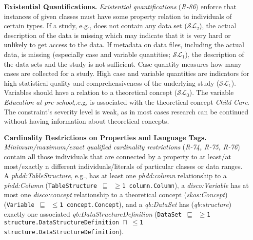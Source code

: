 \documentclass{llncs}
\newcommand{\ms}[1]{\texttt{#1}}
\begin{document}
\textbf{Existential Quantifications.}
\emph{Existential quantifications} (\emph{R-86}) enforce that instances of given classes must have some property relation to individuals of certain types.
If a study, e.g., does not contain any data set ($\mathcal{SL}_{2}$), the actual description of the data is missing which may indicate that it is very hard or unlikely to get access to the data.
If metadata on data files, including the actual data, is missing (especially case and variable quantities; $\mathcal{SL}_{1}$), the description of the data sets and the study is not sufficient.
Case quantity measures how many cases are collected for a study.
High case and variable quantities are indicators for high statistical quality and comprehensiveness of the underlying study ($\mathcal{SL}_{1}$).
Variables should have a relation to a theoretical concept ($\mathcal{SL}_{0}$).
The variable \emph{Education at pre-school},.e.g, is associated with the theoretical concept \emph{Child Care}. 
The constraint's severity level is weak, as in most cases research can be continued without having information about theoretical concepts.

\textbf{Cardinality Restrictions on Properties and Language Tags.}
\emph{Minimum/maximum/exact qualified cardinality restrictions} (\emph{R-74, R-75, R-76}) contain all those individuals that are connected by a property to at least/at most/exactly n different individuals/literals of particular classes or data ranges.
A \emph{phdd:TableStructure}, e.g., has at least one \emph{phdd:column} relationship to a \emph{phdd:Column} (\ms{TableStructure $\sqsubseteq$ $\geq$1 column.Column}),
a \emph{disco:Variable} has at most one \emph{disco:concept} relationship to a theoretical concept (\emph{skos:Concept}) (\ms{Variable $\sqsubseteq$ $\leq$1 concept.Concept}), and a \emph{qb:DataSet} has (\emph{qb:structure}) exactly one associated \emph{qb:DataStructureDefinition} (\ms{DataSet $\sqsubseteq$ $\geq$1 structure.DataStructureDefinition $\sqcap$ $\leq$1 structure.DataStructureDefinition}).
\end{document}
